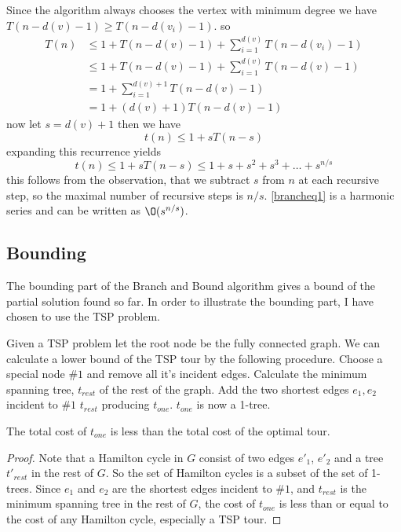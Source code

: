 \documentclass[10pt]{article}
\begin{document}
Since the algorithm always chooses the vertex with minimum degree we have $T(n-d(v)-1) \geq T(n-d(v_i)-1)$. so
\begin{align}
T(n) &\leq 1 + T(n-d(v)-1) + \sum_{i=1}^{d(v)} T(n-d(v_i)-1) \\
     &\leq 1 + T(n-d(v)-1) + \sum_{i=1}^{d(v)} T(n-d(v)-1)   \\
     &= 1 + \sum_{i=1}^{d(v)+1} T(n-d(v)-1)                  \\
     &= 1 + (d(v)+1)T(n-d(v)-1)          
\end{align}
now let $s = d(v)+1$ then we have
\begin{equation}
  t(n) \leq 1 + sT(n-s)          
\end{equation}
expanding this recurrence yields
\begin{equation}
  t(n) \leq 1 + sT(n-s) \leq 1 + s + s^2+s^3+\ldots+s^{n/s}  \label{brancheq1}       
\end{equation}
this follows from the observation, that we subtract $s$ from $n$ at each recursive step, so the maximal number of recursive steps is $n/s$. \ref{brancheq1} is a harmonic series and can be written as $\O(s^{n/s})$.


\subsection{Bounding} %
\label{sub:bounding}
The bounding part of the Branch and Bound algorithm gives a bound of the partial solution found so far. In order to illustrate the bounding part, I have chosen to use the TSP problem. 

Given a TSP problem let the root node be the fully connected graph. We can calculate a lower bound of the TSP tour by the following procedure. Choose a special node $\#1$ and remove all it's incident edges. Calculate the minimum spanning tree, $t_{rest}$ of the rest of the graph. Add the two shortest edges $e_1,e_2$ incident to $\#1$ $t_{rest}$ producing $t_{one}$. $t_{one}$  is now a 1-tree. 

\begin{definition}
The total cost of $t_{one}$ is less than the total cost of the optimal tour.  
\end{definition}

\begin{proof}
  Note that a Hamilton cycle in $G$ consist of two edges $e'_1$, $e'_2$ and a tree $t'_{rest}$ in the rest of $G$. So the set of Hamilton cycles is a subset of the set of 1-trees. Since $e_1$ and $e_2$ are the shortest edges incident to $\#1$, and $t_{rest}$ is the minimum spanning tree in the rest of $G$, the cost of $t_{one}$ is less than or equal to the cost of any Hamilton cycle, especially a TSP tour.
\end{proof}
\end{document}
